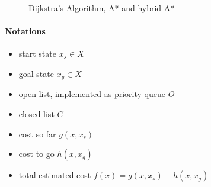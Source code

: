 \begin{figure}[h]
    \caption{Dijkstra's Algorithm, A* and hybrid A*}
    \label{fig:searchComparison}
\end{figure}

\paragraph{Notations}
\begin{itemize}
    \item start state $x_s \in X$
    \item goal state $x_g \in X$
    \item open list, implemented as priority queue $O$
    \item closed list $C$
    \item cost so far $g(x,x_s)$
    \item cost to go $h(x,x_g)$
    \item total estimated cost $f(x) = g(x,x_s) + h(x,x_g)$
\end{itemize}

